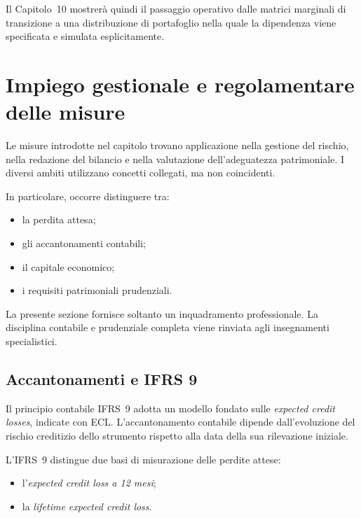Il Capitolo~10 mostrer\`{a} quindi il passaggio operativo dalle matrici
marginali di transizione a una distribuzione di portafoglio nella quale
la dipendenza viene specificata e simulata esplicitamente.

\section{Impiego gestionale e regolamentare delle misure}

\label{sec:cap9-impiego-gestionale-regolamentare}

Le misure introdotte nel capitolo trovano applicazione nella gestione
del rischio, nella redazione del bilancio e nella valutazione
dell'adeguatezza patrimoniale. I diversi ambiti utilizzano concetti
collegati, ma non coincidenti.

In particolare, occorre distinguere tra:

\begin{itemize}
\item la perdita attesa;
\item gli accantonamenti contabili;
\item il capitale economico;
\item i requisiti patrimoniali prudenziali.
\end{itemize}

La presente sezione fornisce soltanto un inquadramento professionale.
La disciplina contabile e prudenziale completa viene rinviata agli
insegnamenti specialistici.

\subsection{Accantonamenti e IFRS 9}

\label{subsec:cap9-ifrs9}

Il principio contabile IFRS~9 adotta un modello fondato sulle
\emph{expected credit losses}, indicate con ECL. L'accantonamento
contabile dipende dall'evoluzione del rischio creditizio dello
strumento rispetto alla data della sua rilevazione iniziale.

L'IFRS~9 distingue due basi di misurazione delle perdite attese:

\begin{itemize}

\item l'\emph{expected credit loss a 12 mesi};

\item la \emph{lifetime expected credit loss}.

\end{itemize}

